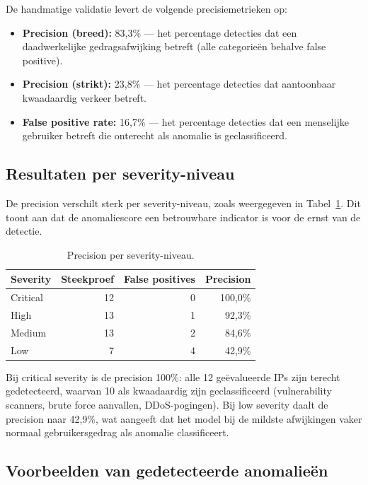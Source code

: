De handmatige validatie levert de volgende precisiemetrieken op:
 
\begin{itemize}
    \item \textbf{Precision (breed):} 83,3\% --- het percentage detecties dat een daadwerkelijke gedragsafwijking betreft (alle categorieën behalve false positive).
    \item \textbf{Precision (strikt):} 23,8\% --- het percentage detecties dat aantoonbaar kwaadaardig verkeer betreft.
    \item \textbf{False positive rate:} 16,7\% --- het percentage detecties dat een menselijke gebruiker betreft die onterecht als anomalie is geclassificeerd.
\end{itemize}
 
\subsection{Resultaten per severity-niveau}
 
De precision verschilt sterk per severity-niveau, zoals weergegeven in Tabel~\ref{tab:precision-per-severity}. Dit toont aan dat de anomaliescore een betrouwbare indicator is voor de ernst van de detectie.
 
\begin{table}[h]
\centering
\caption{Precision per severity-niveau.}
\label{tab:precision-per-severity}
\begin{tabular}{l r r r}
\hline
\textbf{Severity} & \textbf{Steekproef} & \textbf{False positives} & \textbf{Precision} \\
\hline
Critical & 12 & 0 & 100,0\% \\
High & 13 & 1 & 92,3\% \\
Medium & 13 & 2 & 84,6\% \\
Low & 7 & 4 & 42,9\% \\
\hline
\end{tabular}
\end{table}
 
Bij critical severity is de precision 100\%: alle 12 geëvalueerde IPs zijn terecht gedetecteerd, waarvan 10 als kwaadaardig zijn geclassificeerd (vulnerability scanners, brute force aanvallen, DDoS-pogingen). Bij low severity daalt de precision naar 42,9\%, wat aangeeft dat het model bij de mildste afwijkingen vaker normaal gebruikersgedrag als anomalie classificeert.
 
\subsection{Voorbeelden van gedetecteerde anomalieën}

